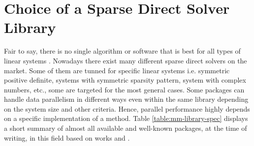 \section{Choice of a Sparse Direct Solver Library}
\label{subseq:mm-library-choice}



Fair to say, there is no single algorithm or software that is best for all types of linear systems \cite{list-of-sparse-direct-solvers}. Nowadays there exist many different sparse direct solvers on the market. Some of them are tunned for specific linear systems i.e. symmetric positive definite, systems with symmetric sparsity pattern, system with complex numbers, etc., some are targeted for the most general cases. Some packages can handle data parallelism in different ways even within the same library depending on the system size and other criteria. Hence, parallel performance highly depends on a specific implementation of a method. Table \ref{table:mm-library-spec} displays a short summary of almost all available and well-known packages, at the time of writing, in this field based on works \cite{list-of-sparse-direct-solvers} and \cite{petsc-web-page}.\\



